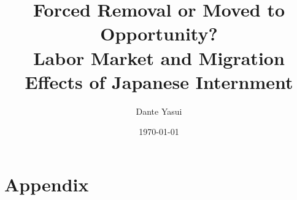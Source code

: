 \documentclass[a4paper,12pt]{article}
\author{Dante Yasui}
\date{\today}
\title{Forced Removal or Moved to Opportunity?\\\medskip
\large Labor Market and Migration Effects of Japanese Internment}
\begin{document}
\maketitle













\newpage
\singlespacing






\newpage

\appendix

\section*{Appendix}










\end{document}
